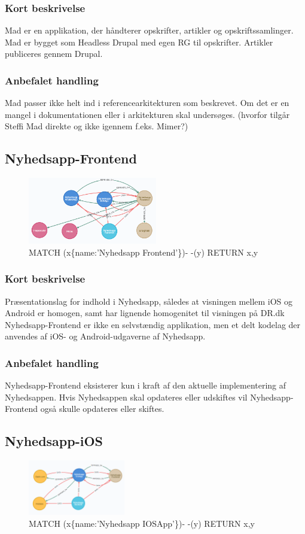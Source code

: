\documentclass{article}
\begin{document}
\subsubsection*{Kort beskrivelse}
Mad er en applikation, der håndterer opskrifter, artikler og opskriftssamlinger. Mad er bygget som Headless Drupal med egen RG til opskrifter. Artikler publiceres gennem Drupal. 
\subsubsection*{Anbefalet handling}
Mad passer ikke helt ind i referencearkitekturen som beskrevet. Om det er en mangel i dokumentationen eller i arkitekturen skal undersøges. (hvorfor tilgår Steffi Mad direkte og ikke igennem f.eks. Mimer?)


\subsection{Nyhedsapp-Frontend}
\begin{figure}[h]
\includegraphics[width=160pt]{Nyhedsapp-Frontend.PNG}
\caption{MATCH (x\{name:'Nyhedsapp Frontend'\})- -(y) RETURN x,y}
\end{figure}
\subsubsection*{Kort beskrivelse}
Præsentationslag for indhold i Nyhedsapp, således at visningen mellem iOS og Android er homogen, samt har lignende homogenitet til visningen på DR.dk
Nyhedsapp-Frontend er ikke en selvstændig applikation, men et delt kodelag der anvendes af iOS- og Android-udgaverne af Nyhedsapp. 
\subsubsection*{Anbefalet handling}
Nyhedsapp-Frontend eksisterer kun i kraft af den aktuelle implementering af Nyhedsappen. Hvis Nyhedsappen skal opdateres eller udskiftes vil Nyhedsapp-Frontend også skulle opdateres eller skiftes.


\subsection{Nyhedsapp-iOS}
\begin{figure}[h]
\includegraphics[width=120pt]{Nyhedsapp-IOS.PNG}
\caption{MATCH (x\{name:'Nyhedsapp IOSApp'\})- -(y) RETURN x,y}
\end{figure}
\end{document}
